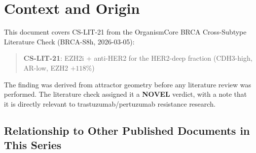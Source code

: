 \documentclass[12pt, a4paper]{article}
\begin{document}
\tableofcontents
\newpage

\section{Context and Origin}

This document covers CS-LIT-21 from the
OrganismCore BRCA Cross-Subtype Literature Check
(BRCA-S8h, 2026-03-05):

\begin{quote}
\textbf{CS-LIT-21}: EZH2i + anti-HER2 for the
HER2-deep fraction (CDH3-high, AR-low,
EZH2 $+118\%$)
\end{quote}

The finding was derived from attractor geometry
before any literature review was performed.
The literature check assigned it a
\textbf{NOVEL} verdict, with a note that it is
directly relevant to trastuzumab/pertuzumab
resistance research.

\subsection{Relationship to Other Published
Documents in This Series}
\end{document}
